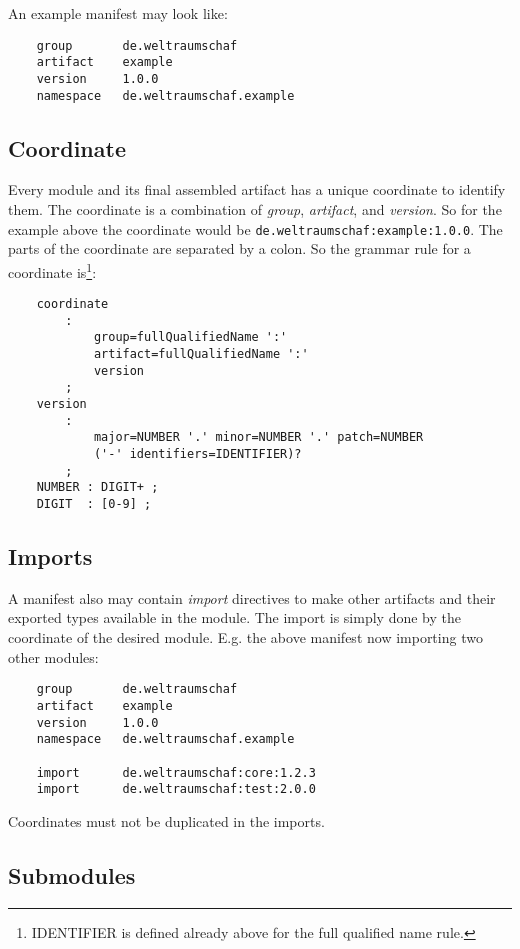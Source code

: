 \documentclass[a4paper,12pt]{report}
\begin{document}
\noindent
An example manifest may look like:

\begin{verbatim}
    group       de.weltraumschaf
    artifact    example
    version     1.0.0
    namespace   de.weltraumschaf.example
\end{verbatim}

\subsection{Coordinate}

Every module and its final assembled artifact has a unique coordinate to identify them. The coordinate is a combination of \textit{group}, \textit{artifact}, and \textit{version}. So for the example above the coordinate would be \verb|de.weltraumschaf:example:1.0.0|. The parts of the coordinate are separated by a colon. So the grammar rule for a coordinate is\footnote{IDENTIFIER is defined already above for the full qualified name rule.}:

\begin{verbatim}
    coordinate 
        : 
            group=fullQualifiedName ':' 
            artifact=fullQualifiedName ':' 
            version
        ;
    version
        : 
            major=NUMBER '.' minor=NUMBER '.' patch=NUMBER 
            ('-' identifiers=IDENTIFIER)?
        ;        
    NUMBER : DIGIT+ ;
    DIGIT  : [0-9] ;
\end{verbatim}

\subsection{Imports}

A manifest also may contain \textit{import} directives to make other artifacts and their exported types available in the module. The import is simply done by the coordinate of the desired module. E.g. the above manifest now importing two other modules:

\begin{verbatim}
    group       de.weltraumschaf
    artifact    example
    version     1.0.0
    namespace   de.weltraumschaf.example
    
    import      de.weltraumschaf:core:1.2.3
    import      de.weltraumschaf:test:2.0.0
\end{verbatim}

Coordinates must not be duplicated in the imports.

\subsection{Submodules}
\end{document}
